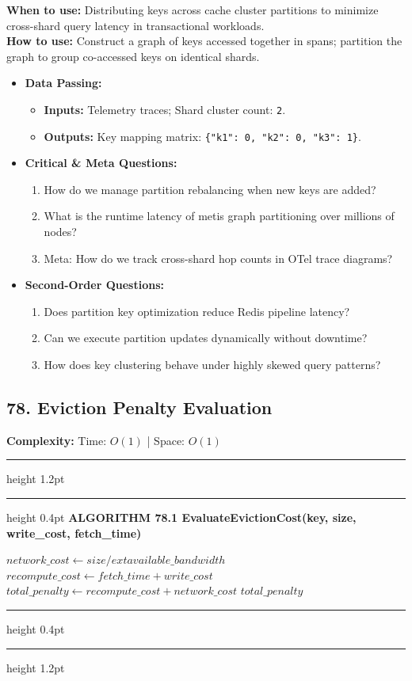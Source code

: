 \documentclass[11pt,a4paper]{article}
\newenvironment{textbookalgo}[2]{%
  \par\addvspace{1.2em}\noindent
  \hrule height 1.2pt
  \vspace{1.5pt}
  \hrule height 0.4pt
  \vspace{5pt}
  {\noindent\large\bfseries\sffamily ALGORITHM #1 \quad #2}
  \par\vspace{5pt}
  \RestyleAlgo{plain}
}{%
  \par\vspace{4pt}
  \hrule height 0.4pt
  \vspace{1.5pt}
  \hrule height 1.2pt
  \par\addvspace{1.2em}
}
\theoremstyle{definition}
\begin{document}
\noindent
\textbf{When to use:} Distributing keys across cache cluster partitions to minimize cross-shard query latency in transactional workloads.\\
\textbf{How to use:} Construct a graph of keys accessed together in spans; partition the graph to group co-accessed keys on identical shards.
\begin{itemize}[leftmargin=*]
  \item[] \textbf{Data Passing:}
    \begin{itemize}
      \item \textbf{Inputs:} Telemetry traces; Shard cluster count: \texttt{2}.
      \item \textbf{Outputs:} Key mapping matrix: \texttt{\{"k1": 0, "k2": 0, "k3": 1\}}.
    \end{itemize}
  \item[] \textbf{Critical \& Meta Questions:}
  \begin{enumerate}
    \item How do we manage partition rebalancing when new keys are added?
    \item What is the runtime latency of metis graph partitioning over millions of nodes?
    \item Meta: How do we track cross-shard hop counts in OTel trace diagrams?
  \end{enumerate}
  \item[] \textbf{Second-Order Questions:}
  \begin{enumerate}
    \item Does partition key optimization reduce Redis pipeline latency?
    \item Can we execute partition updates dynamically without downtime?
    \item How does key clustering behave under highly skewed query patterns?
  \end{enumerate}
\end{itemize}
\medskip

\clearpage
\subsection{78. Eviction Penalty Evaluation}


\noindent
\textbf{Complexity:} Time: $O(1)$ | Space: $O(1)$
\smallskip

\begin{textbookalgo}{78.1}{EvaluateEvictionCost(key, size, write\_cost, fetch\_time)}
\begin{algorithm}[H]
$network\_cost \leftarrow size / 	ext{available\_bandwidth}$\;
$recompute\_cost \leftarrow fetch\_time + write\_cost$\;
$total\_penalty \leftarrow recompute\_cost + network\_cost$\;
\Return $total\_penalty$\;
\end{algorithm}
\end{textbookalgo}
\end{document}
